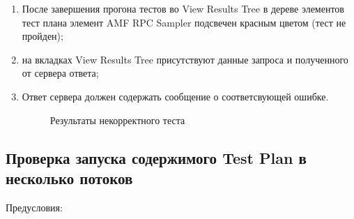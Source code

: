 \begin{enumerate}
\item После завершения прогона тестов во View Results Tree в дереве элементов тест плана элемент AMF RPC Sampler
подсвечен красным цветом (тест не пройден);
\item на вкладках View Results Tree присутствуют данные запроса и полученного от сервера ответа;
\item Ответ сервера должен содержать сообщение о соответсвующей ошибке.

\begin{figure}[ht]
\caption{Результаты некорректного теста}
\label{ris:negativeTest.png}
\end{figure}

\end{enumerate}

\subsection{Проверка запуска содержимого Test Plan в несколько потоков}

Предусловия:

